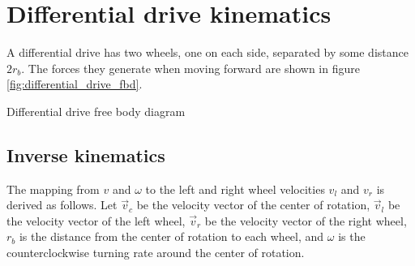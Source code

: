 \section{Differential drive kinematics}

A differential drive has two wheels, one on each side, separated by some
distance $2r_b$. The forces they generate when moving forward are shown in
figure \ref{fig:differential_drive_fbd}.
\begin{bookfigure}

  \caption{Differential drive free body diagram}
  \label{fig:differential_drive_fbd}
\end{bookfigure}

\subsection{Inverse kinematics}

The mapping from $v$ and $\omega$ to the left and right wheel velocities $v_l$
and $v_r$ is derived as follows. Let $\vec{v}_c$ be the velocity vector of the
center of rotation, $\vec{v}_l$ be the velocity vector of the left wheel,
$\vec{v}_r$ be the velocity vector of the right wheel, $r_b$ is the distance
from the center of rotation to each wheel, and $\omega$ is the counterclockwise
turning rate around the center of rotation.

